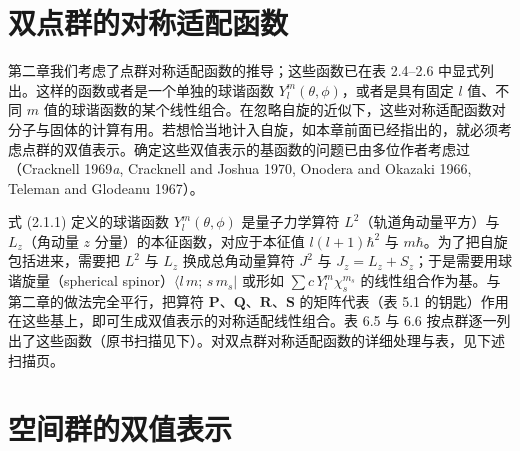 \section{双点群的对称适配函数}

第二章我们考虑了点群对称适配函数的推导；这些函数已在表 2.4--2.6 中显式列出。这样的函数或者是一个单独的球谐函数 $Y^{m}_{l}(\theta, \phi)$，或者是具有固定 $l$ 值、不同 $m$ 值的球谐函数的某个线性组合。在忽略自旋的近似下，这些对称适配函数对分子与固体的计算有用。若想恰当地计入自旋，如本章前面已经指出的，就必须考虑点群的双值表示。确定这些双值表示的基函数的问题已由多位作者考虑过（Cracknell 1969\textit{a}, Cracknell and Joshua 1970, Onodera and Okazaki 1966, Teleman and Glodeanu 1967）。

式 (2.1.1) 定义的球谐函数 $Y^{m}_{l}(\theta, \phi)$ 是量子力学算符 $L^{2}$（轨道角动量平方）与 $L_{z}$（角动量 $z$ 分量）的本征函数，对应于本征值 $l(l+1)\hbar^{2}$ 与 $m\hbar$。为了把自旋包括进来，需要把 $L^{2}$ 与 $L_{z}$ 换成总角动量算符 $J^{2}$ 与 $J_{z} = L_{z} + S_{z}$；于是需要用球谐旋量（spherical spinor）$\langle l\,m;\,s\,m_{s} |$ 或形如 $\sum c\,Y^{m}_{l}\chi^{m_{s}}_{s}$ 的线性组合作为基。与第二章的做法完全平行，把算符 $\mathbf{P}$、$\mathbf{Q}$、$\mathbf{R}$、$\mathbf{S}$ 的矩阵代表（表 5.1 的钥匙）作用在这些基上，即可生成双值表示的对称适配线性组合。表 6.5 与 6.6 按点群逐一列出了这些函数（原书扫描见下）。对双点群对称适配函数的详细处理与表，见下述扫描页。



\section{空间群的双值表示}

